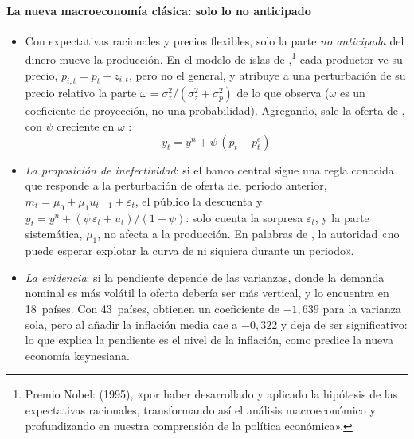 \documentclass[11pt]{article}
\begin{document}
\paragraph{La nueva macroeconomía clásica: solo lo no anticipado}
\begin{itemize}
\item Con expectativas racionales y precios flexibles, solo la parte \emph{no anticipada} del dinero mueve la producción. En el modelo de islas de \textcite{Lucas1972Expectations},\footnote{Premio Nobel:  (1995), «por haber desarrollado y aplicado la hipótesis de las expectativas racionales, transformando así el análisis macroeconómico y profundizando en nuestra comprensión de la política económica»\nocite{NobelPrize1995Lucas}.} cada productor ve su precio, $p_{i,t}=p_t+z_{i,t}$, pero no el general, y atribuye a una perturbación de su precio relativo la parte $\omega=\sigma^2_z/(\sigma^2_z+\sigma^2_p)$ de lo que observa ($\omega$ es un coeficiente de proyección, no una probabilidad). Agregando, sale la oferta de , con $\psi$ creciente en $\omega$ :
  \begin{equation}
  y_t=y^n+\psi\,(p_t-p^e_t) \label{eq:oferta-lucas}
  \end{equation}
\item \emph{La proposición de inefectividad}: si el banco central sigue una regla conocida que responde a la perturbación de oferta del periodo anterior, $m_t=\mu_0+\mu_1u_{t-1}+\varepsilon_t$, el público la descuenta y $y_t=y^n+(\psi\,\varepsilon_t+u_t)/(1+\psi)$: solo cuenta la sorpresa $\varepsilon_t$, y la parte sistemática, $\mu_1$, no afecta a la producción\nocite{SargentWallace1975Rational}. En palabras de \textcite{SargentWallace1976Rational}, la autoridad «no puede esperar explotar la curva de  ni siquiera durante un periodo».
\item \emph{La evidencia}: si la pendiente depende de las varianzas, donde la demanda nominal es más volátil la oferta debería ser más vertical, y \textcite{Lucas1973Some} lo encuentra en 18~países. Con 43~países, \textcite{BallMankiwRomer1988} obtienen un coeficiente de $-1{,}639$ para la varianza sola, pero al añadir la inflación media cae a $-0{,}322$ y deja de ser significativo: lo que explica la pendiente es el nivel de la inflación, como predice la nueva economía keynesiana.

\end{itemize}
\end{document}
